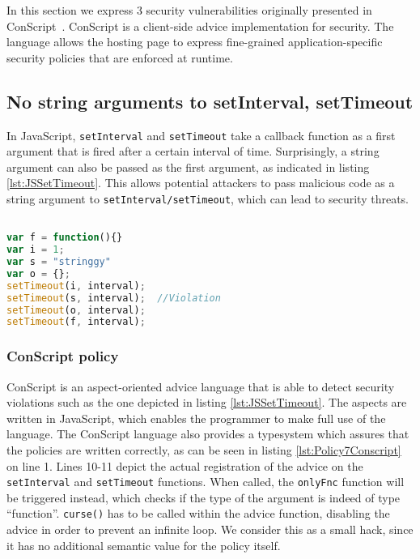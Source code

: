 In this section we express 3 security vulnerabilities originally presented in ConScript~\cite{ConScript}. ConScript is a client-side advice implementation for security. The language allows the hosting page to express fine-grained application-specific security policies that are enforced at runtime.

\subsection{No string arguments to setInterval, setTimeout}


In JavaScript, \texttt{setInterval} and \texttt{setTimeout} take a callback function as a first argument that is fired after a certain interval of time. Surprisingly, a string argument can also be passed as the first argument, as indicated in listing \ref{lst:JSSetTimeout}. This allows potential attackers to pass malicious code as a string argument to \texttt{setInterval/setTimeout}, which can lead to security threats.


\begin{lstlisting}[label={lst:JSSetTimeout},language=JavaScript,caption=No string arguments to setTimeout,mathescape=true]  % float=t?

var f = function(){}
var i = 1;
var s = "stringgy"
var o = {};
setTimeout(i, interval);
setTimeout(s, interval);  //Violation
setTimeout(o, interval);
setTimeout(f, interval);
\end{lstlisting}

\subsubsection*{ConScript policy}

ConScript is an aspect-oriented advice language that is able to detect security violations such as the one depicted in listing \ref{lst:JSSetTimeout}. The aspects are written in JavaScript, which enables the programmer to make full use of the language. The ConScript language also provides a typesystem which assures that the policies are written correctly, as can be seen in listing \ref{lst:Policy7Conscript} on line 1. Lines 10-11 depict the actual registration of the advice on the \texttt{setInterval} and \texttt{setTimeout} functions. When called, the \texttt{onlyFnc} function will be triggered instead, which checks if the type of the argument is indeed of type ``function''. \texttt{curse()} has to be called within the advice function, disabling the advice in order to prevent an infinite loop. We consider this as a small hack, since it has no additional semantic value for the policy itself.

